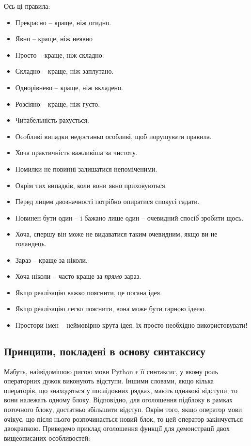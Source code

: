 \documentclass[a4paper, 12pt, onsedie]{article}
\begin{document}
Ось ці правила:
\begin{itemize}
    \item Прекрасно -- краще, ніж огидно.
    \item Явно -- краще, ніж неявно
    \item Просто -- краще, ніж складно.
    \item Складно -- краще, ніж заплутано.
    \item Однорівнево -- краще, ніж вкладено.
    \item Розсіяно -- краще, ніж густо.
    \item Читабельність рахується.
    \item Особливі випадки недостаньо особливі, щоб порушувати правила.
    \item Хоча практичність важливіша за чистоту.
    \item Помилки не повинні залишатися непоміченими.
    \item Окрім тих випадків, коли вони явно приховуються.
    \item Перед лицем двозначності потрібно опиратися спокусі гадати.
    \item Повинен бути один -- і бажано лише один -- очевидний спосіб зробити щось.
    \item Хоча, спершу він може не видаватися таким очевидним, якщо ви не голандець.
    \item Зараз -- краще за ніколи.
    \item Хоча ніколи -- часто краще за \emph{прямо} зараз.
    \item Якщо реалізацію важко пояснити, це погана ідея.
    \item Якщо реалізацію легко пояснити, вона може бути гарною ідеєю.
    \item Простори імен -- неймовірно крута ідея, їх просто необхідно використовувати!
\end{itemize}

\subsection{Принципи, покладені в основу синтаксису}
Мабуть, найвідомішою рисою мови Python є її синтаксис, у якому роль операторних дужок
виконують відступи. Іншими словами, якщо кілька операторів, що знаходяться у послідовних 
рядках, мають однакові відступи, то вони належать одному блоку. Відповідно, для оголошення
підблоку в рамках поточного блоку, достатньо збільшити відступ. Окрім того, якщо оператор
мови очікує, що після нього розпочинається новий блок, то цей оператор закінчується 
двокрапкою. Приведемо приклад оголошення функції для демонстрації двох вищеописаних
особливостей:
\end{document}
